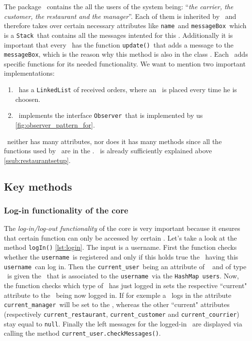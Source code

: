 The package \users~contains the all the users of the system being: ``\textit{the carrier, the customer, the restaurant and the manager}''.
Each of them is inherited by \User~and therefore takes over certain necessary attributes like \lstinline|name|~and \lstinline|messageBox|~which is a \lstinline|Stack|~that contains all the messages intented for this \User. Additionally it is important that every \User~has the function \lstinline|update()|~that adds a message to the \lstinline|messageBox|, which is the reason why this method is also in the class \User. Each \User~adds specific functions for its needed functionality. We want to mention two important implementations:

\begin{enumerate}
	\item \Courier~has a \lstinline|LinkedList| of received orders, where an \Order~is placed every time he is choosen.
	\item \Customer~implements the interface \lstinline|Observer|~that is implemented by us \ref{fig:observer_pattern_for}.
\end{enumerate}

\Manager~neither has many attributes, nor does it has many methods since all the functions used by \Manager~are in the \Core.
\Restaurent~is already sufficiently explained above \ref{ssub:restaurantsetup}.


\subsection{Key methods} %
\label{sub:key_methods}

\subsubsection{Log-in functionality of the core} %
\label{ssub:log_in_functionality_of_the_core}

The \emph{log-in/log-out functionality} of the core is very important because it ensures that certain function can only be accessed by certain \User. Let's take a look at the method \lstinline|logIn()| \ref{lst:login}. The input is a username. First the function checks whether the \lstinline|username|~is registered and only if this holds true the \User~having this \lstinline|username|~can log in. Then the \lstinline|current_user|~being an attribute of \Core~ and of type \User~is given the \User~that is associated to the \lstinline|username|~via the \lstinline|HashMap|~\lstinline|users|. Now, the function checks which type of \User~has just logged in sets the respective ``current" attribute to the \User~being now logged in. If for exemple a \Manager~logs in the attribute \lstinline|current_manager|~will be set to the \User, whereas the other ``current" attributes (respectively \lstinline|current_restaurant|, \lstinline|current_customer| and \lstinline|current_courrier|) stay equal to \lstinline|null|. Finally the left messages for the logged-in \User~are displayed via calling the method \lstinline|current_user.checkMessages()|.

